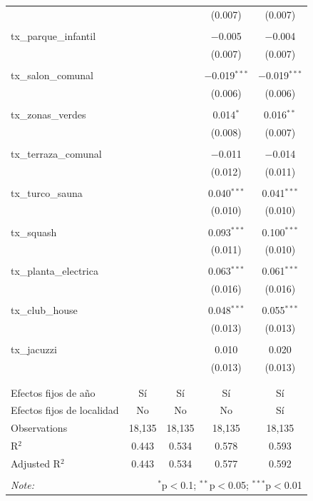 \begin{table}[!htbp]
\begin{tabular}{@{\extracolsep{5pt}}lcccc}
  &  &  & (0.007) & (0.007) \\ 
  & & & & \\ 
 tx\_parque\_infantil &  &  & $-$0.005 & $-$0.004 \\ 
  &  &  & (0.007) & (0.007) \\ 
  & & & & \\ 
 tx\_salon\_comunal &  &  & $-$0.019$^{***}$ & $-$0.019$^{***}$ \\ 
  &  &  & (0.006) & (0.006) \\ 
  & & & & \\ 
 tx\_zonas\_verdes &  &  & 0.014$^{*}$ & 0.016$^{**}$ \\ 
  &  &  & (0.008) & (0.007) \\ 
  & & & & \\ 
 tx\_terraza\_comunal &  &  & $-$0.011 & $-$0.014 \\ 
  &  &  & (0.012) & (0.011) \\ 
  & & & & \\ 
 tx\_turco\_sauna &  &  & 0.040$^{***}$ & 0.041$^{***}$ \\ 
  &  &  & (0.010) & (0.010) \\ 
  & & & & \\ 
 tx\_squash &  &  & 0.093$^{***}$ & 0.100$^{***}$ \\ 
  &  &  & (0.011) & (0.010) \\ 
  & & & & \\ 
 tx\_planta\_electrica &  &  & 0.063$^{***}$ & 0.061$^{***}$ \\ 
  &  &  & (0.016) & (0.016) \\ 
  & & & & \\ 
 tx\_club\_house &  &  & 0.048$^{***}$ & 0.055$^{***}$ \\ 
  &  &  & (0.013) & (0.013) \\ 
  & & & & \\ 
 tx\_jacuzzi &  &  & 0.010 & 0.020 \\ 
  &  &  & (0.013) & (0.013) \\ 
  & & & & \\ 
\hline \\[-1.8ex] 
Efectos fijos de año & Sí & Sí & Sí & Sí \\ 
Efectos fijos de localidad & No & No & No & Sí \\ 
Observations & 18,135 & 18,135 & 18,135 & 18,135 \\ 
R$^{2}$ & 0.443 & 0.534 & 0.578 & 0.593 \\ 
Adjusted R$^{2}$ & 0.443 & 0.534 & 0.577 & 0.592 \\ 
\hline 
\hline \\[-1.8ex] 
\textit{Note:}  & \multicolumn{4}{r}{$^{*}$p$<$0.1; $^{**}$p$<$0.05; $^{***}$p$<$0.01} \\ 
\end{tabular} 
\end{table} 
